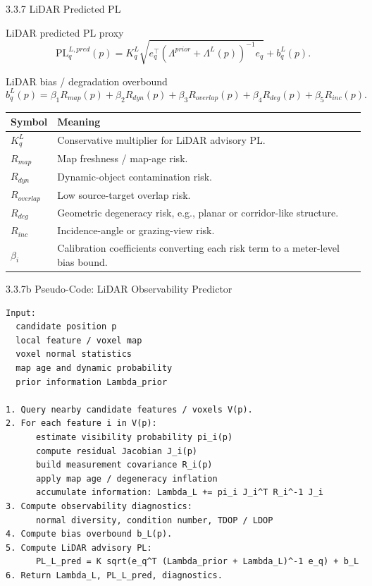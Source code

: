 \documentclass[10pt,aspectratio=169,xcolor=dvipsnames]{beamer}
\newcommand{\PL}{\mathrm{PL}}
\begin{document}
\begin{frame}{3.3.7 LiDAR Predicted PL}
  \small
  \begin{block}{LiDAR predicted PL proxy}
    \[
      \PL^{L,pred}_q(p)=
      K^L_q\sqrt{e_q^\top\left(\Lambda^{prior}+\Lambda^L(p)\right)^{-1}e_q}+b^L_q(p).
    \]
  \end{block}

  \begin{block}{LiDAR bias / degradation overbound}
    \[
      b^L_q(p)=\beta_1R_{map}(p)+\beta_2R_{dyn}(p)+\beta_3R_{overlap}(p)+\beta_4R_{deg}(p)+\beta_5R_{inc}(p).
    \]
  \end{block}

  \begin{table}\scriptsize
    \begin{tabular}{p{} p{}}
      \toprule
      \textbf{Symbol} & \textbf{Meaning}\\
      \midrule
      $K^L_q$ & Conservative multiplier for LiDAR advisory PL.\\
      $R_{map}$ & Map freshness / map-age risk.\\
      $R_{dyn}$ & Dynamic-object contamination risk.\\
      $R_{overlap}$ & Low source-target overlap risk.\\
      $R_{deg}$ & Geometric degeneracy risk, e.g., planar or corridor-like structure.\\
      $R_{inc}$ & Incidence-angle or grazing-view risk.\\
      $\beta_i$ & Calibration coefficients converting each risk term to a meter-level bias bound.\\
      \bottomrule
    \end{tabular}
  \end{table}
\end{frame}

\begin{frame}[fragile]{3.3.7b Pseudo-Code: LiDAR Observability Predictor}
\begin{lstlisting}
Input:
  candidate position p
  local feature / voxel map
  voxel normal statistics
  map age and dynamic probability
  prior information Lambda_prior

1. Query nearby candidate features / voxels V(p).
2. For each feature i in V(p):
      estimate visibility probability pi_i(p)
      compute residual Jacobian J_i(p)
      build measurement covariance R_i(p)
      apply map age / degeneracy inflation
      accumulate information: Lambda_L += pi_i J_i^T R_i^-1 J_i
3. Compute observability diagnostics:
      normal diversity, condition number, TDOP / LDOP
4. Compute bias overbound b_L(p).
5. Compute LiDAR advisory PL:
      PL_L_pred = K sqrt(e_q^T (Lambda_prior + Lambda_L)^-1 e_q) + b_L
6. Return Lambda_L, PL_L_pred, diagnostics.
\end{lstlisting}
\end{frame}
\end{document}

